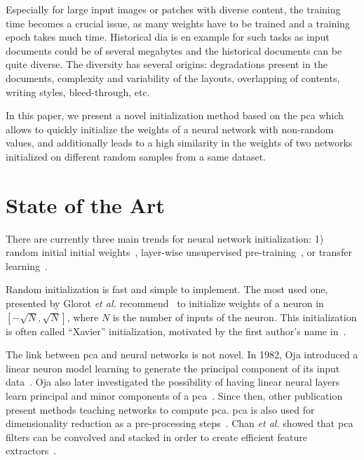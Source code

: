 \documentclass[conference]{IEEEtran}
\begin{document}
Especially for large input images or patches with diverse content, the training time becomes a crucial issue, as many weights have to be trained and a training epoch takes much time.
Historical \ac{dia} is en example for such tasks as input documents could be of several megabytes and the historical documents can be quite diverse.
The diversity has several origins: degradations present in the documents, complexity and variability of the layouts, overlapping of contents, writing styles, bleed-through, etc.

In this paper, we present a novel initialization method based on the \ac{pca} which allows to quickly initialize the weights of a neural network with non-random values, and additionally leads to a high similarity in the weights of two networks initialized on different random samples from a same dataset.

\section{State of the Art}\label{sct:state-of-art}
There are currently three main trends for neural network initialization: 1) random initial initial weights~\cite{glorot2010understanding}, layer-wise unsupervised pre-training~\cite{ballard1987modular,hinton2006fast}, or transfer learning~\cite{caruana1998multitask}.

Random initialization is fast and simple to implement.
The most used one, presented by Glorot \textit{et al.} recommend~\cite{glorot2010understanding} to initialize weights of a neuron in $\left[-\sqrt{N}, \sqrt{N}\right]$, where $N$ is the number of inputs of the neuron.
This initialization is often called ``Xavier'' initialization, motivated by the first author's name in~\cite{glorot2010understanding}.


The link between \ac{pca} and neural networks is not novel.
In 1982, Oja introduced a linear neuron model learning to generate the principal component of its input data~\cite{oja1982simplified}.
Oja also later investigated the possibility of having linear neural layers learn principal and minor components of a \ac{pca}~\cite{oja1992principal}.
Since then, other publication present methods teaching networks to compute \ac{pca}.
\ac{pca} is also used for dimensionality reduction as a pre-processing steps~\cite{ngiam2011multimodal,sun2014deep}.
Chan \textit{et al.} showed that \ac{pca} filters can be convolved and stacked in order to create efficient feature extractors~\cite{chan2015pcanet}.
\end{document}
